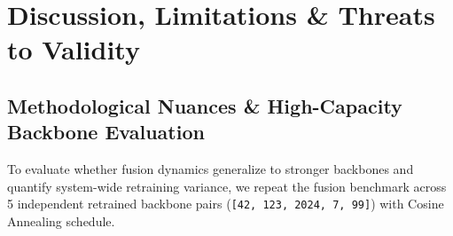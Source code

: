 
\section{Discussion, Limitations \& Threats to Validity}
\label{sec:threats}

\subsection{Methodological Nuances \& High-Capacity Backbone Evaluation}
\label{sec:high_capacity}

To evaluate whether fusion dynamics generalize to stronger backbones and quantify system-wide retraining variance, we repeat the fusion benchmark across 5 independent retrained backbone pairs (\texttt{[42, 123, 2024, 7, 99]}) with Cosine Annealing schedule.

